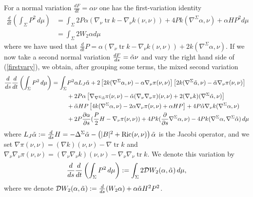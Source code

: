 \documentclass[12pt,a4paper]{amsart}
\theoremstyle{plain}
\theoremstyle{definition}
\newcommand{\tr}{\operatorname{tr}}
\begin{document}
For a normal variation $ \frac{d F}{d t} = \alpha \nu $ one has the first-variation identity
\begin{equation}\label{firstvary}
\begin{split}
    \frac{d }{d t}\left( \int_\Sigma P^2 \,d\mu \right)&= \int_\Sigma 2 P \alpha ( \nabla_{\nu} \tr k - \nabla_{\nu} k(\nu,\nu )) +4 P    k(\nabla^\Sigma \alpha, \nu )
   +\alpha H P^2  d\mu\\
   &= \int_\Sigma   2 W_2 \alpha  d\mu
   \end{split}
\end{equation}
where we have used that $ \frac{d }{d t} P= \alpha ( \nabla_{\nu} \tr k - \nabla_{\nu} k(\nu,\nu )) +2     k(\nabla^\Sigma \alpha, \nu ) $. If we now take a second normal variation  $ \frac{d F}{d s} = \Tilde{\alpha} \nu$ and
vary the right hand side of (\ref{firstvary}), we obtain, after grouping some terms, the mixed second variation
\begin{equation}\label{secondvary}
    \begin{split}
   \frac{d }{d s}\frac{d }{d t}\left( \int_\Sigma P^2 \,d\mu \right)=\int_\Sigma &P^2 \alpha L_J \Tilde{\alpha} + 2  \left[ 2     k(\nabla^\Sigma \alpha,  \nu )- \alpha \nabla_\nu\pi(\nu,\nu) \right] \left[ 2    k(\nabla^\Sigma \Tilde{\alpha}, \nu ) -\Tilde{\alpha} \nabla_\nu\pi(\nu,\nu)\right] \\
&+ 2 P \alpha \left[   \nabla_{\nabla^\Sigma \Tilde{\alpha}}\pi(\nu,\nu) - \Tilde{\alpha} (\nabla_\nu\nabla_\nu\pi)(\nu,\nu)  +2 (\nabla_{\nu} k)(\nabla^\Sigma \Tilde{\alpha},\nu ) \right] \\    
   & +\Tilde{\alpha} H P \left[  4     k(\nabla^\Sigma \alpha, \nu )- 2  \alpha \nabla_\nu\pi(\nu,\nu)
   +\alpha H P  \right] + 4 P \Tilde{\alpha} \nabla_{\nu  }k(\nabla^\Sigma \alpha, \nu)  \\
   &+ 2 P \frac{\partial \alpha }{\partial s}  ( \frac{P}{2} H- \nabla_\nu\pi(\nu,\nu)) +4 Pk (\frac{\partial}{\partial s} \nabla^\Sigma \alpha, \nu) -4 P k(\nabla^\Sigma \alpha, \nabla^\Sigma \Tilde{\alpha} )\, d\mu\\
    \end{split}
\end{equation}
where $L_{J} \Tilde{\alpha}:= \frac{d }{d s}H=  - \Delta^\Sigma \Tilde{\alpha} - \left(|B|^2 + \mathrm{Ric} (\nu, \nu )\right)  \Tilde{\alpha} $ is the Jacobi operator, and  we set $\nabla\pi(\nu,\nu)=(\nabla k)(\nu,\nu ) -\nabla \tr k $ and $\nabla_\nu\nabla_\nu\pi(\nu,\nu)=(\nabla_\nu\nabla_\nu k)(\nu,\nu ) -\nabla_\nu\nabla_\nu \tr k $.
We denote this variation by 
\begin{equation}
   \frac{d }{d s}\frac{d }{d t}\left( \int_\Sigma P^2 \,d\mu \right):= \int_\Sigma 2 \mathcal{D}W_2(\alpha, \Tilde{\alpha} ) \,d\mu, 
\end{equation}
where we denote $\mathcal{D}W_2(\alpha, \Tilde{\alpha} ) :=  \frac{d }{d s} (W_2 \alpha)+ \alpha \Tilde{\alpha}H^2P^2  $.
\end{document}
